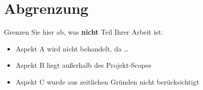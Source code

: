 
\section{Abgrenzung}
\label{sec:abgrenzung}

Grenzen Sie hier ab, was \textbf{nicht} Teil Ihrer Arbeit ist:
\begin{itemize}
    \item Aspekt A wird nicht behandelt, da \dots
    \item Aspekt B liegt außerhalb des Projekt-Scopes
    \item Aspekt C wurde aus zeitlichen Gründen nicht berücksichtigt
\end{itemize}

